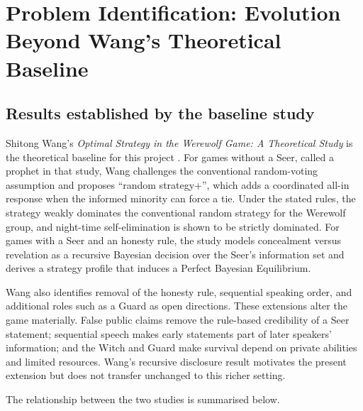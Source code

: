 \documentclass[11pt,a4paper]{article}
\begin{document}
\section{Problem Identification: Evolution Beyond Wang's Theoretical Baseline}

\subsection{Results established by the baseline study}

Shitong Wang's \emph{Optimal Strategy in the Werewolf Game: A Theoretical Study} is the theoretical baseline for this project \cite{wang2025}. For games without a Seer, called a prophet in that study, Wang challenges the conventional random-voting assumption and proposes ``random strategy+'', which adds a coordinated all-in response when the informed minority can force a tie. Under the stated rules, the strategy weakly dominates the conventional random strategy for the Werewolf group, and night-time self-elimination is shown to be strictly dominated. For games with a Seer and an honesty rule, the study models concealment versus revelation as a recursive Bayesian decision over the Seer's information set and derives a strategy profile that induces a Perfect Bayesian Equilibrium.

Wang also identifies removal of the honesty rule, sequential speaking order, and additional roles such as a Guard as open directions. These extensions alter the game materially. False public claims remove the rule-based credibility of a Seer statement; sequential speech makes early statements part of later speakers' information; and the Witch and Guard make survival depend on private abilities and limited resources. Wang's recursive disclosure result motivates the present extension but does not transfer unchanged to this richer setting.

The relationship between the two studies is summarised below.
\end{document}
